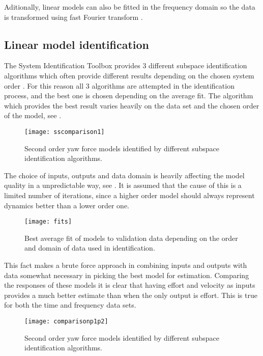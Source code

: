 Aditionally, linear models can also be fitted in the frequency domain so the data is transformed using fast Fourier transform \cite{van1992computational}.

\subsection{Linear model identification}
The System Identification Toolbox provides 3 different subspace identification algorithms which often provide different results depending on the chosen system order \cite{van1994n4sid}. 
For this reason all 3 algorithms are attempted in the identification process, and the best one is chosen depending on the average fit.
The algorithm which provides the best result varies heavily on the data set and the chosen order of the model, see .

\begin{figure}[H]
\centering
\hspace{-2em}\texttt{[image: sscomparison1]}
\caption{Second order yaw force models identified by different subspace identification algorithms.}
\label{fig:ssid1}
\end{figure}

The choice of inputs, outputs and data domain is heavily affecting the model quality in a unpredictable way, see .
It is assumed that the cause of this is a limited number of iterations, since a higher order model should always represent dynamics better than a lower order one.

\begin{figure}[H]
\hspace{-2.5em}\texttt{[image: fits]}
\caption{Best average fit of models to validation data depending on the order and domain of data used in identification.}
\label{fig:fits}
\end{figure}

This fact makes a brute force approach in combining inputs and outputs with data somewhat necessary in picking the best model for estimation.
Comparing the responses of these models it is clear that having effort and velocity as inputs provides a much better estimate than when the only output is effort.
This is true for both the time and frequency data sets. 

\begin{figure}[H]
\centering
\hspace{-2em}\texttt{[image: comparisonp1p2]}
\caption{Second order yaw force models identified by different subspace identification algorithms.}
\label{fig:1LMI2}
\end{figure}



